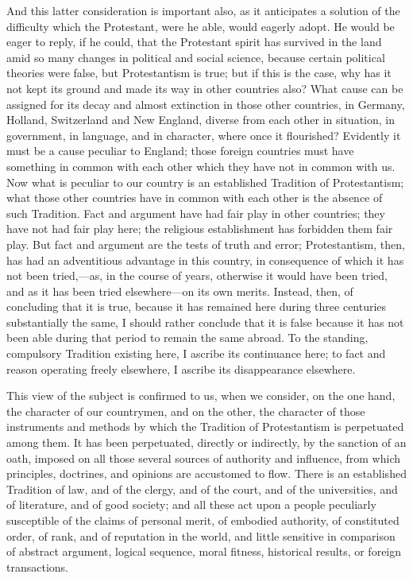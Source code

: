 And this latter consideration is important also, as it
anticipates a solution of the difficulty which the
Protestant, were he able, would eagerly adopt. He would
be eager to reply, if he could, that the Protestant
spirit has survived in the land amid so many changes in
political and social science, because certain political
theories were false, but Protestantism is true; but if
this is the case, why has it not kept its ground and made
its way in other countries also? What cause can be
assigned for its decay and almost extinction in those
other countries, in Germany, Holland, Switzerland and New
England, diverse from each other in situation, in
government, in language, and in character, where once it
flourished? Evidently it must be a cause peculiar to
England; those foreign countries must have something in
common with each other which they have not in common with
us. Now what is peculiar to our country is an established
Tradition of Protestantism; what those other countries
have in common with each other is the absence of such
Tradition. Fact and argument have had fair play in other
countries; they have not had fair play here; the
religious establishment has forbidden them fair play. But
fact and argument are the tests of truth and error;
Protestantism, then, has had an adventitious advantage in
this country, in consequence of which it has not been
tried,—as, in the course of years, otherwise it
would have been tried, and as it has been tried
elsewhere—on its own merits. Instead, then, of
concluding that it is true, because it has remained here
during three centuries substantially the same, I should
rather conclude that it is false because it has not been
able during that period to remain the same abroad. To the
standing, compulsory Tradition existing here, I ascribe
its continuance here; to fact and reason operating freely
elsewhere, I ascribe its disappearance elsewhere.

This view of the subject is confirmed to us, when we
consider, on the one hand, the character of our
countrymen, and on the other, the character of those
instruments and methods by which the Tradition of
Protestantism is perpetuated among them. It has been
perpetuated, directly or indirectly, by the sanction of
an oath, imposed on all those several sources of
authority and influence, from which principles,
doctrines, and opinions are accustomed to flow. There is
an established Tradition of law, and of the clergy, and
of the court, and of the universities, and of literature,
and of good society; and all these act upon a people
peculiarly susceptible of the claims of personal merit,
of embodied authority, of constituted order, of rank, and
of reputation in the world, and little sensitive in
comparison of abstract argument, logical sequence, moral
fitness, historical results, or foreign transactions.

